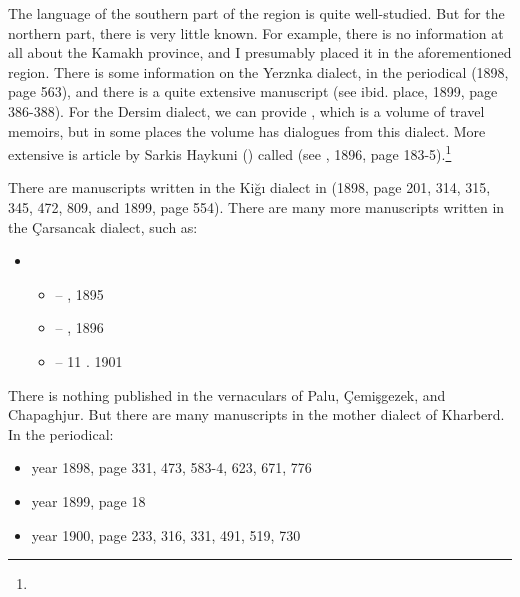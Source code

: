 The language of the southern part of the region is quite well-studied. But for the northern part, there is very little known. For example, there is no information at all about the Kamakh province, and I presumably placed it in the aforementioned region. There is some information on the Yerznka dialect, in the periodical  (1898, page 563), and there is a quite extensive manuscript (see ibid. place, 1899, page 386-388). For the Dersim dialect, we can provide \citet{Antranik-1900-Dersim}, which is a volume of travel memoirs, but in some places the volume has dialogues from this dialect. More extensive is article by Sarkis Haykuni () called  (see , 1896, page 183-5).\footnote{} 
 
{\litoverview}

There are manuscripts written in the Kiğı dialect in  (1898, page 201, 314, 315, 345, 472, 809, and 1899, page 554). There are many more manuscripts written in the Çarsancak dialect, such as:


\begin{itemize}
	\item {}
	\begin{itemize}
		\item – , 1895
		\item – , 1896
		\item – 11 . 1901
	\end{itemize}
\end{itemize}

\begin{adjarianpage}\label{page:168}\end{adjarianpage}%

There is nothing published in the vernaculars of Palu, Çemişgezek, and Chapaghjur. But there are many manuscripts in the mother dialect of Kharberd. In the  periodical: 
\begin{itemize}
	\item year 1898, page 331, 473, 583-4, 623, 671, 776
	\item year 1899, page 18
	\item year 1900, page 233, 316, 331, 491, 519, 730
	
\end{itemize}

